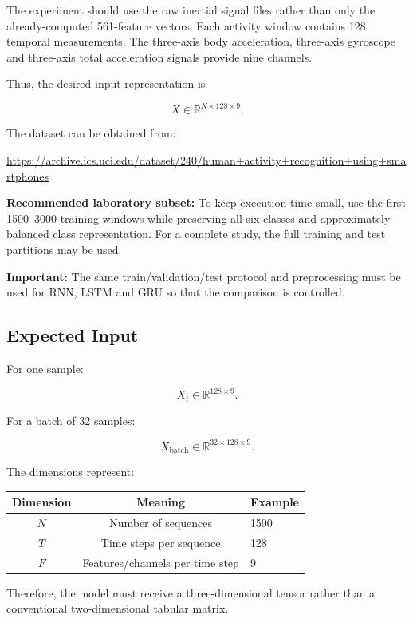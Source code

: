 \documentclass[10pt]{article}
\begin{document}
The experiment should use the raw inertial signal files rather than only the
already-computed 561-feature vectors. Each activity window contains 128
temporal measurements. The three-axis body acceleration, three-axis
gyroscope and three-axis total acceleration signals provide nine channels.

Thus, the desired input representation is

\[
X\in\mathbb{R}^{N\times128\times9}.
\]

The dataset can be obtained from:

\url{https://archive.ics.uci.edu/dataset/240/human+activity+recognition+using+smartphones}

\textbf{Recommended laboratory subset:} To keep execution time small, use
the first 1500--3000 training windows while preserving all six classes and
approximately balanced class representation. For a complete study, the full
training and test partitions may be used.

\textbf{Important:} The same train/validation/test protocol and preprocessing
must be used for RNN, LSTM and GRU so that the comparison is controlled.

\subsection*{Expected Input}

For one sample:

\[
X_i\in\mathbb{R}^{128\times9}.
\]

For a batch of 32 samples:

\[
X_{\mathrm{batch}}\in\mathbb{R}^{32\times128\times9}.
\]

The dimensions represent:

\begin{center}
\begin{tabular}{|c|c|l|}
\hline
Dimension & Meaning & Example\\
\hline
$N$ & Number of sequences & 1500\\
$T$ & Time steps per sequence & 128\\
$F$ & Features/channels per time step & 9\\
\hline
\end{tabular}
\end{center}

Therefore, the model must receive a three-dimensional tensor rather than a
conventional two-dimensional tabular matrix.

\end{document}

